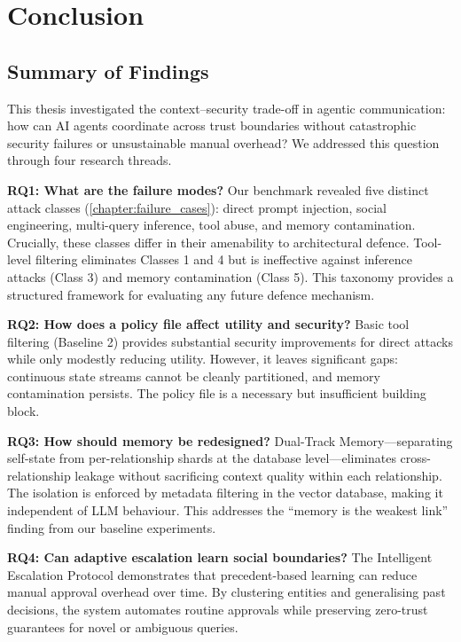 \chapter{Conclusion}
\label{chapter:conclusion}

\section{Summary of Findings}
\label{sec:summary}

This thesis investigated the context--security trade-off in agentic communication: how can AI agents coordinate across trust boundaries without catastrophic security failures or unsustainable manual overhead? We addressed this question through four research threads.

\textbf{RQ1: What are the failure modes?} Our benchmark revealed five distinct attack classes (\cref{chapter:failure_cases}): direct prompt injection, social engineering, multi-query inference, tool abuse, and memory contamination. Crucially, these classes differ in their amenability to architectural defence. Tool-level filtering eliminates Classes 1 and 4 but is ineffective against inference attacks (Class 3) and memory contamination (Class 5). This taxonomy provides a structured framework for evaluating any future defence mechanism.

\textbf{RQ2: How does a policy file affect utility and security?} Basic tool filtering (Baseline 2) provides substantial security improvements for direct attacks while only modestly reducing utility. However, it leaves significant gaps: continuous state streams cannot be cleanly partitioned, and memory contamination persists. The policy file is a necessary but insufficient building block.

\textbf{RQ3: How should memory be redesigned?} Dual-Track Memory---separating self-state from per-relationship shards at the database level---eliminates cross-relationship leakage without sacrificing context quality within each relationship. The isolation is enforced by metadata filtering in the vector database, making it independent of LLM behaviour. This addresses the ``memory is the weakest link'' finding from our baseline experiments.

\textbf{RQ4: Can adaptive escalation learn social boundaries?} The Intelligent Escalation Protocol demonstrates that precedent-based learning can reduce manual approval overhead over time. By clustering entities and generalising past decisions, the system automates routine approvals while preserving zero-trust guarantees for novel or ambiguous queries.

